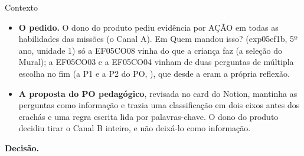\begin{especificacao}{Contexto}
\begin{itemize}
  \item \textbf{O pedido.} O dono do produto pediu evidência por AÇÃO em todas
    as habilidades das missões (o Canal A). Em Quem mandou isso? (exp05ef1b, 5º
    ano, unidade 1) só a EF05CO08 vinha do que a criança faz (a seleção do
    Mural); a EF05CO03 e a EF05CO04 vinham de duas perguntas de múltipla
    escolha no fim (a P1 e a P2 do PO, ), que desde a
     eram a própria reflexão.
  \item \textbf{A proposta do PO pedagógico}, revisada no card do Notion,
    mantinha as perguntas como informação e trazia uma classificação em dois
    eixos antes dos crachás e uma regra escrita lida por palavras-chave. O dono
    do produto decidiu tirar o Canal B inteiro, e não deixá-lo como
    informação.
\end{itemize}
\end{especificacao}

\textbf{Decisão.}

